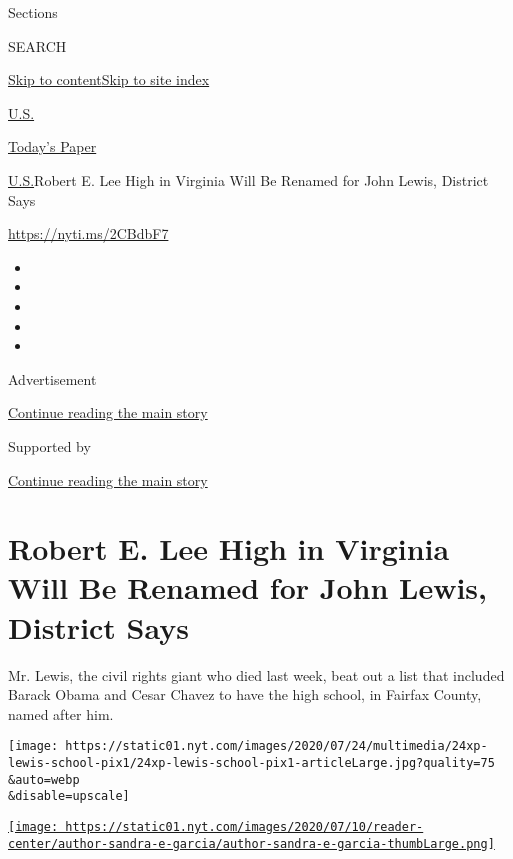 Sections

SEARCH

\protect\hyperlink{site-content}{Skip to
content}\protect\hyperlink{site-index}{Skip to site index}

\href{https://www.nytimes.com/section/us}{U.S.}

\href{https://myaccount.nytimes.com/auth/login?response_type=cookie\&client_id=vi}{}

\href{https://www.nytimes.com/section/todayspaper}{Today's Paper}

\href{/section/us}{U.S.}\textbar{}Robert E. Lee High in Virginia Will Be
Renamed for John Lewis, District Says

\url{https://nyti.ms/2CBdbF7}

\begin{itemize}
\item
\item
\item
\item
\item
\end{itemize}

Advertisement

\protect\hyperlink{after-top}{Continue reading the main story}

Supported by

\protect\hyperlink{after-sponsor}{Continue reading the main story}

\hypertarget{robert-e-lee-high-in-virginia-will-be-renamed-for-john-lewis-district-says}{%
\section{Robert E. Lee High in Virginia Will Be Renamed for John Lewis,
District
Says}\label{robert-e-lee-high-in-virginia-will-be-renamed-for-john-lewis-district-says}}

Mr. Lewis, the civil rights giant who died last week, beat out a list
that included Barack Obama and Cesar Chavez to have the high school, in
Fairfax County, named after him.

\texttt{[image: https://static01.nyt.com/images/2020/07/24/multimedia/24xp-lewis-school-pix1/24xp-lewis-school-pix1-articleLarge.jpg?quality=75\\\&auto=webp\\\&disable=upscale]}

\href{https://www.nytimes.com/by/sandra-e-garcia}{\texttt{[image: https://static01.nyt.com/images/2020/07/10/reader-center/author-sandra-e-garcia/author-sandra-e-garcia-thumbLarge.png]}}

